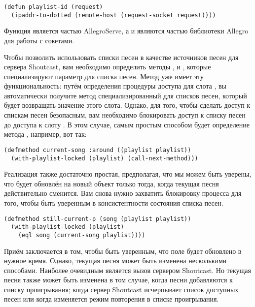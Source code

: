 \begin{lstlisting}
(defun playlist-id (request)
  (ipaddr-to-dotted (remote-host (request-socket request))))
\end{lstlisting}

Функция  является частью AllegroServe, а  и
 являются частью библиотеки Allegro для работы с сокетами.

Чтобы позволить использовать списки песен в качестве источников песен для сервера
Shoutcast, вам необходимо определить методы ,  и
, которые специализируют параметр  для списка
песен. Метод  уже имеет эту функциональность: путём определения
процедуры доступа  для слота , вы автоматически
получите метод  специализированный для списков песен, который будет
возвращать значение этого слота. Однако, для того, чтобы сделать доступ к спискам песен
безопасным, вам необходимо блокировать доступ к списку песен до доступа к слоту
.  В этом случае, самым простым способом будет определение метода
, например, вот так:

\begin{lstlisting}
(defmethod current-song :around ((playlist playlist))
  (with-playlist-locked (playlist) (call-next-method)))
\end{lstlisting}

Реализация  также достаточно простая, предполагая, что мы можем быть
уверены, что  будет обновлён на новый объект  только тогда,
когда текущая песня действительно сменится.  Вам снова нужно захватить блокировку процесса
для того, чтобы быть уверенным в консистентности состояния списка песен.

\begin{lstlisting}
(defmethod still-current-p (song (playlist playlist))
  (with-playlist-locked (playlist)
    (eql song (current-song playlist))))
\end{lstlisting}

Приём заключается в том, чтобы быть уверенным, что поле  будет
обновлено в нужное время.  Однако, текущая песня может быть изменена несколькими
способами.  Наиболее очевидным является вызов  сервером
Shoutcast.  Но текущая песня также может быть изменена в том случае, когда песни
добавляются к списку проигрывания; когда сервер Shoutcast исчерпывает список доступных
песен или когда изменяется режим повторения в списке проигрывания.

